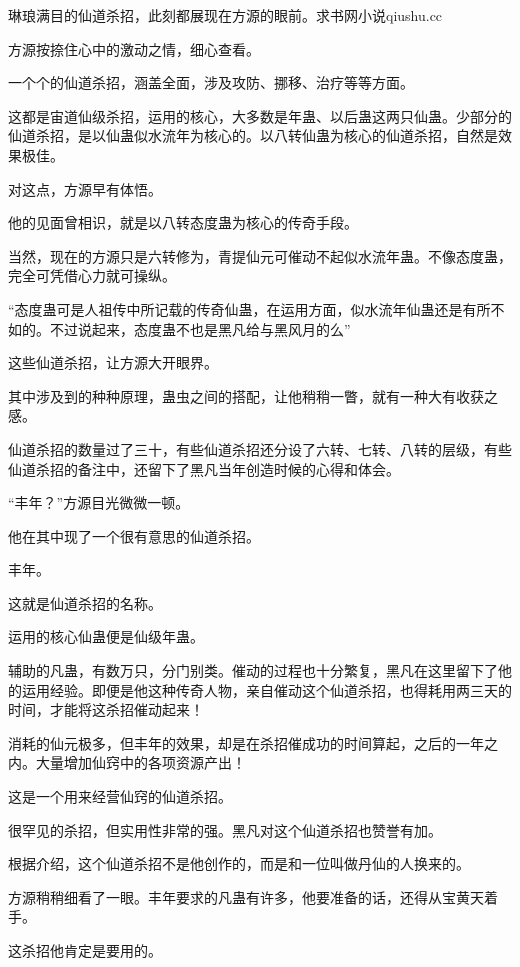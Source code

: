
\begin{this_body}

琳琅满目的仙道杀招，此刻都展现在方源的眼前。求书网小说qiushu.cc

方源按捺住心中的激动之情，细心查看。

一个个的仙道杀招，涵盖全面，涉及攻防、挪移、治疗等等方面。

这都是宙道仙级杀招，运用的核心，大多数是年蛊、以后蛊这两只仙蛊。少部分的仙道杀招，是以仙蛊似水流年为核心的。以八转仙蛊为核心的仙道杀招，自然是效果极佳。

对这点，方源早有体悟。

他的见面曾相识，就是以八转态度蛊为核心的传奇手段。

当然，现在的方源只是六转修为，青提仙元可催动不起似水流年蛊。不像态度蛊，完全可凭借心力就可操纵。

“态度蛊可是人祖传中所记载的传奇仙蛊，在运用方面，似水流年仙蛊还是有所不如的。不过说起来，态度蛊不也是黑凡给与黑风月的么”

这些仙道杀招，让方源大开眼界。

其中涉及到的种种原理，蛊虫之间的搭配，让他稍稍一瞥，就有一种大有收获之感。

仙道杀招的数量过了三十，有些仙道杀招还分设了六转、七转、八转的层级，有些仙道杀招的备注中，还留下了黑凡当年创造时候的心得和体会。

“丰年？”方源目光微微一顿。

他在其中现了一个很有意思的仙道杀招。

丰年。

这就是仙道杀招的名称。

运用的核心仙蛊便是仙级年蛊。

辅助的凡蛊，有数万只，分门别类。催动的过程也十分繁复，黑凡在这里留下了他的运用经验。即便是他这种传奇人物，亲自催动这个仙道杀招，也得耗用两三天的时间，才能将这杀招催动起来！

消耗的仙元极多，但丰年的效果，却是在杀招催成功的时间算起，之后的一年之内。大量增加仙窍中的各项资源产出！

这是一个用来经营仙窍的仙道杀招。

很罕见的杀招，但实用性非常的强。黑凡对这个仙道杀招也赞誉有加。

根据介绍，这个仙道杀招不是他创作的，而是和一位叫做丹仙的人换来的。

方源稍稍细看了一眼。丰年要求的凡蛊有许多，他要准备的话，还得从宝黄天着手。

这杀招他肯定是要用的。


\end{this_body}
